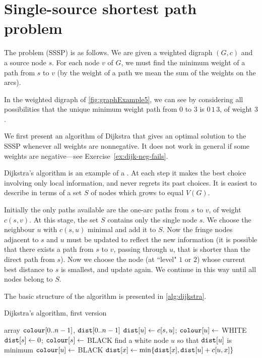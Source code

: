 \section{Single-source shortest path problem}
\label{sec:SSSP}

The  problem (SSSP) is as
follows. We are given a weighted digraph $(G, c)$ and a source node
$s$. For each node $v$ of $G$, we must find the minimum weight of a path
from $s$ to $v$ (by the weight of a path we mean the sum of the weights
on the arcs).

\begin{Example}
\label{eg:SSSP}
In the weighted digraph of \cref{fig:graphExample5}, we can see by
considering all possibilities that the unique minimum weight path from
$0$ to $3$ is $0\, 1\, 3$, of weight $3$.
\end{Example}

We first present an algorithm of Dijkstra that gives an optimal
solution to the SSSP whenever all weights are nonnegative. It
does not work in general if some weights are negative---see
Exercise~\ref{ex:dijk-neg-fails}. 

Dijkstra's algorithm is an example of a . At
each step it makes the best choice involving only local information,
and never regrets its past choices. It is easiest to describe in terms of
a set $S$ of nodes which grows to equal $V(G)$. 

Initially the only paths available are the one-arc paths from $s$ to
$v$, of weight $c(s, v)$. At this stage, the set $S$  contains only the
single node $s$. We choose the neighbour $u$ with $c(s, u)$ minimal and
add it to $S$. Now the fringe nodes adjacent to $s$ and $u$ must be
updated to reflect the new information (it is possible that there
exists a path from $s$ to $v$, passing through $u$, that is shorter
than the direct path from $s$). Now we choose the node (at ``level" $1$
or $2$) whose current best distance to $s$ is smallest, and update
again. We continue in this way until all nodes belong to $S$.

The basic structure of the algorithm is presented in
\cref{alg:dijkstra}.

\begin{algorithm}[H]
  \caption{Dijkstra's algorithm, first version}
    \label{alg:dijkstra}
\begin{algorithmic}[1]
	\State array $\colour[0..n-1]$, $\dist[0..n-1]$
		\State $\dist[u] \gets c[s,u]$; $\colour[u] \gets$ WHITE 
	\EndFor
	\State $\dist[s] \gets 0$; $\colour[s] \gets $ BLACK
		\State find a white node $u$ so that $\dist[u]$ is minimum
		\State $\colour[u] \gets $ BLACK
				\State $\dist[x] \gets \min \{\dist[x], \dist[u] + c[u,x]\}$  
			\EndIf
		\EndFor
	\EndWhile
	\State \Return{$\dist$}
\EndFunction
\end{algorithmic}
\end{algorithm}


